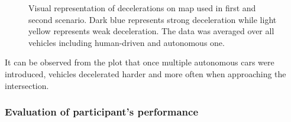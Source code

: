 \documentclass[11pt,english,twoside]{article}
\begin{document}
\begin{figure}[!]
\centering
{}


\caption{Visual representation of decelerations on map used in first and second scenario. Dark blue represents strong deceleration while light yellow represents weak deceleration. The data was averaged over all vehicles including human-driven and autonomous one.}
\label{fig:decelerations1}
\end{figure}

It can be observed from the plot that once multiple autonomous cars were introduced, vehicles decelerated harder and more often when approaching the intersection.







\subsubsection{Evaluation of participant's performance}
\paragraph{}
\end{document}
